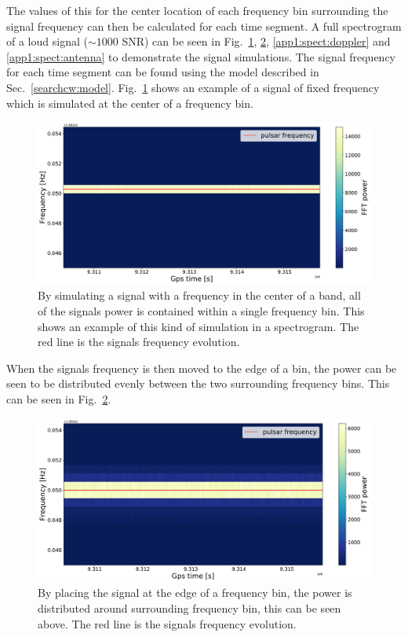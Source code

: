 The values of this for the center location of each frequency bin surrounding the signal frequency can then be calculated for each time segment. 
A full spectrogram of a loud signal ($\sim 1000$ \gls{SNR}) can be seen in Fig.~\ref{app1:spect:centerbin}, \ref{app1:spect:edgebin}, \ref{app1:spect:doppler} and \ref{app1:spect:antenna} to demonstrate the signal simulations.
The signal frequency for each time segment can be found using the model described in Sec.~\ref{searchcw:model}.
Fig.~\ref{app1:spect:centerbin} shows an example of a signal of fixed frequency which is simulated at the center of a frequency bin.
\begin{figure}[h]
	\centering
	\includegraphics[width=\linewidth]{AppendixA/centerbin_nodop_noant.pdf}
	\caption{By simulating a signal with a frequency in the center of a band, all of the signals power is contained within a single frequency bin. This shows an example of this kind of simulation in a spectrogram. The red line is the signals frequency evolution.}
	\label{app1:spect:centerbin}
\end{figure}
When the signals frequency is then moved to the edge of a bin, the power can be seen to be distributed evenly between the two surrounding frequency bins. This can be seen in Fig.~\ref{app1:spect:edgebin}.
\begin{figure}[h]
	\centering
	\includegraphics[width=\linewidth]{AppendixA/edgebin_nodop_noant.pdf}
	\caption{By placing the signal at the edge of a frequency bin, the power is distributed around surrounding frequency bin, this can be seen above. The red line is the signals frequency evolution.}
	\label{app1:spect:edgebin}
\end{figure}
